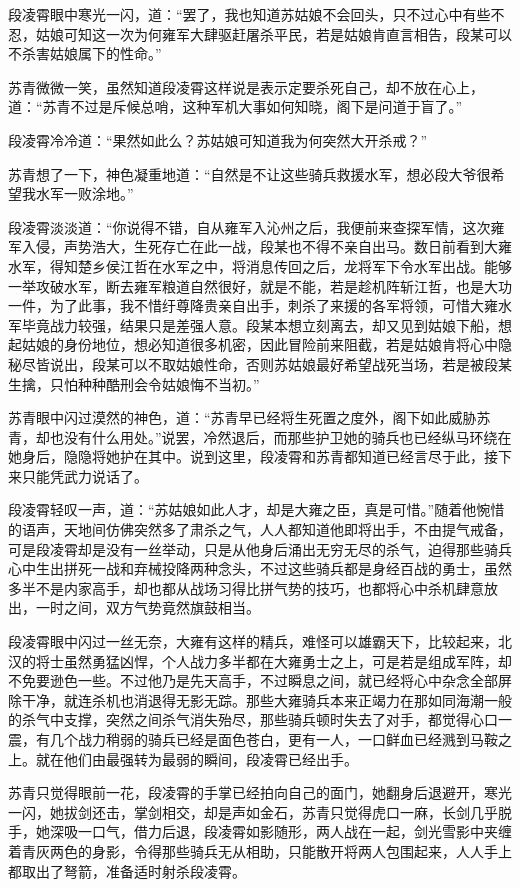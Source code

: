 段凌霄眼中寒光一闪，道：“罢了，我也知道苏姑娘不会回头，只不过心中有些不忍，姑娘可知这一次为何雍军大肆驱赶屠杀平民，若是姑娘肯直言相告，段某可以不杀害姑娘属下的性命。”

苏青微微一笑，虽然知道段凌霄这样说是表示定要杀死自己，却不放在心上，道：“苏青不过是斥候总哨，这种军机大事如何知晓，阁下是问道于盲了。”

段凌霄冷冷道：“果然如此么？苏姑娘可知道我为何突然大开杀戒？”

苏青想了一下，神色凝重地道：“自然是不让这些骑兵救援水军，想必段大爷很希望我水军一败涂地。”

段凌霄淡淡道：“你说得不错，自从雍军入沁州之后，我便前来查探军情，这次雍军入侵，声势浩大，生死存亡在此一战，段某也不得不亲自出马。数日前看到大雍水军，得知楚乡侯江哲在水军之中，将消息传回之后，龙将军下令水军出战。能够一举攻破水军，断去雍军粮道自然很好，就是不能，若是趁机阵斩江哲，也是大功一件，为了此事，我不惜纡尊降贵亲自出手，刺杀了来援的各军将领，可惜大雍水军毕竟战力较强，结果只是差强人意。段某本想立刻离去，却又见到姑娘下船，想起姑娘的身份地位，想必知道很多机密，因此冒险前来阻截，若是姑娘肯将心中隐秘尽皆说出，段某可以不取姑娘性命，否则苏姑娘最好希望战死当场，若是被段某生擒，只怕种种酷刑会令姑娘悔不当初。”

苏青眼中闪过漠然的神色，道：“苏青早已经将生死置之度外，阁下如此威胁苏青，却也没有什么用处。”说罢，冷然退后，而那些护卫她的骑兵也已经纵马环绕在她身后，隐隐将她护在其中。说到这里，段凌霄和苏青都知道已经言尽于此，接下来只能凭武力说话了。

段凌霄轻叹一声，道：“苏姑娘如此人才，却是大雍之臣，真是可惜。”随着他惋惜的语声，天地间仿佛突然多了肃杀之气，人人都知道他即将出手，不由提气戒备，可是段凌霄却是没有一丝举动，只是从他身后涌出无穷无尽的杀气，迫得那些骑兵心中生出拼死一战和弃械投降两种念头，不过这些骑兵都是身经百战的勇士，虽然多半不是内家高手，却也都从战场习得比拼气势的技巧，也都将心中杀机肆意放出，一时之间，双方气势竟然旗鼓相当。

段凌霄眼中闪过一丝无奈，大雍有这样的精兵，难怪可以雄霸天下，比较起来，北汉的将士虽然勇猛凶悍，个人战力多半都在大雍勇士之上，可是若是组成军阵，却不免要逊色一些。不过他乃是先天高手，不过瞬息之间，就已经将心中杂念全部屏除干净，就连杀机也消退得无影无踪。那些大雍骑兵本来正竭力在那如同海潮一般的杀气中支撑，突然之间杀气消失殆尽，那些骑兵顿时失去了对手，都觉得心口一震，有几个战力稍弱的骑兵已经是面色苍白，更有一人，一口鲜血已经溅到马鞍之上。就在他们由最强转为最弱的瞬间，段凌霄已经出手。

苏青只觉得眼前一花，段凌霄的手掌已经拍向自己的面门，她翻身后退避开，寒光一闪，她拔剑还击，掌剑相交，却是声如金石，苏青只觉得虎口一麻，长剑几乎脱手，她深吸一口气，借力后退，段凌霄如影随形，两人战在一起，剑光雪影中夹缠着青灰两色的身影，令得那些骑兵无从相助，只能散开将两人包围起来，人人手上都取出了弩箭，准备适时射杀段凌霄。

